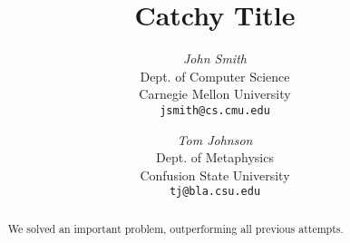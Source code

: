 
\setlength{\textheight}{8.75in}
\setlength{\textwidth}{6.8in}
\setlength{\footheight}{0.0in}
\setlength{\topmargin}{0.25in}
\setlength{\headheight}{0.0in}
\setlength{\headsep}{0.0in}
\setlength{\oddsidemargin}{-.19in}
\setlength{\parindent}{1pc}
\renewcommand{\baselinestretch}{1.3}





\newcommand{\beq}{\begin{equation}}
\newcommand{\eeq}{\end{equation}}
\newcommand{\bit}{\begin{itemize}}
\newcommand{\eit}{\end{itemize}}
\newcommand{\goal}[1]{ {\noindent {$\Rightarrow$} \em {#1} } }
\newcommand{\hide}[1]{}
\newcommand{\comment}[1]{ {\footnotesize {#1} } }
\newtheorem{lemma}{Lemma}
\newtheorem{theorem}{Theorem}
\newtheorem{proof}{Proof}
\newtheorem{defn}{Definition}
\newtheorem{algo}{Algorithm}
\newtheorem{observation}{Observation}


\title{Catchy Title}


\author{ {\em John Smith} \\
	    Dept. of Computer Science \\
	    Carnegie Mellon University \\
	    {\tt jsmith@cs.cmu.edu}
	 \and
	 {\em Tom Johnson} \\
	     Dept. of Metaphysics \\
	     Confusion State University \\
	     {\tt tj@bla.csu.edu}
        }


\maketitle
\begin{abstract}
We solved an important problem,
outperforming all previous attempts.
\end{abstract}

